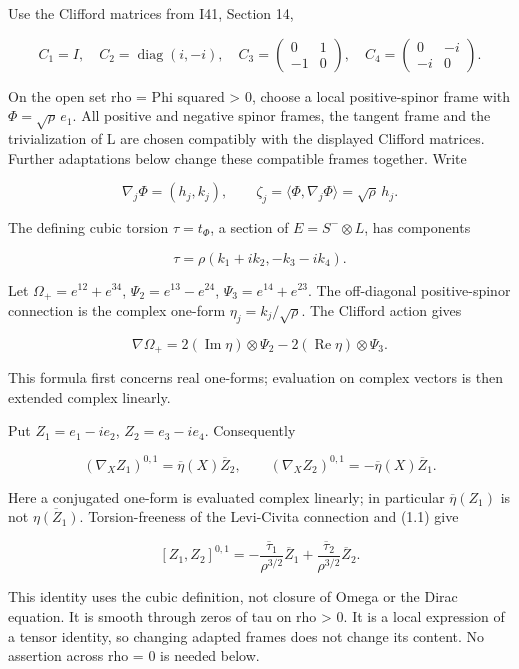 \documentclass[
  10pt,
]{article}
\begin{document}
Use the Clifford matrices from I41, Section 14,

\[
 C_1=I,\quad C_2=\operatorname{diag}(i,-i),\quad
 C_3=\begin{pmatrix}0&1\\-1&0\end{pmatrix},\quad
 C_4=\begin{pmatrix}0&-i\\-i&0\end{pmatrix}.
\]

On the open set rho = \textbar Phi\textbar{} squared \textgreater{} 0,
choose a local positive-spinor frame with \(\Phi=\sqrt\rho\,e_1\). All
positive and negative spinor frames, the tangent frame and the
trivialization of L are chosen compatibly with the displayed Clifford
matrices. Further adaptations below change these compatible frames
together. Write

\[
 \nabla_j\Phi=(h_j,k_j),\qquad
 \zeta_j=\langle\Phi,\nabla_j\Phi\rangle=\sqrt\rho\,h_j.
\]

The defining cubic torsion \(\tau=t_\Phi\), a section of
\(E=S^-\otimes L\), has components

\[
             \tau=\rho(k_1+ik_2,-k_3-ik_4).                \tag{1.1}
\]

Let \(\Omega_+=e^{12}+e^{34}\), \(\Psi_2=e^{13}-e^{24}\),
\(\Psi_3=e^{14}+e^{23}\). The off-diagonal positive-spinor connection is
the complex one-form \(\eta_j=k_j/\sqrt\rho\). The Clifford action gives

\[
 \nabla\Omega_+=2(\operatorname{Im}\eta)\otimes\Psi_2
                         -2(\operatorname{Re}\eta)\otimes\Psi_3.
\]

This formula first concerns real one-forms; evaluation on complex
vectors is then extended complex linearly.

Put \(Z_1=e_1-ie_2\), \(Z_2=e_3-ie_4\). Consequently

\[
 (\nabla_XZ_1)^{0,1}=\overline\eta(X)\overline Z_2,
 \qquad (\nabla_XZ_2)^{0,1}=-\overline\eta(X)\overline Z_1.
\]

Here a conjugated one-form is evaluated complex linearly; in particular
\(\overline\eta(Z_1)\) is not \(\overline{\eta(Z_1)}\). Torsion-freeness
of the Levi-Civita connection and (1.1) give

\[
 \boxed{[Z_1,Z_2]^{0,1}
  =-\frac{\overline\tau_1}{\rho^{3/2}}\overline Z_1
    +\frac{\overline\tau_2}{\rho^{3/2}}\overline Z_2.}      \tag{1.2}
\]

This identity uses the cubic definition, not closure of Omega or the
Dirac equation. It is smooth through zeros of tau on rho \textgreater{}
0. It is a local expression of a tensor identity, so changing adapted
frames does not change its content. No assertion across rho = 0 is
needed below.
\end{document}
